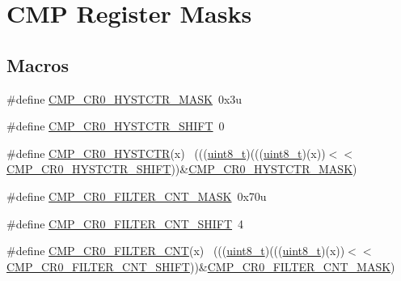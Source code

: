 \hypertarget{group___c_m_p___register___masks}{}\section{C\+MP Register Masks}
\label{group___c_m_p___register___masks}
\subsection*{Macros}
\begin{DoxyCompactItemize}
\item 
\#define \hyperlink{group___c_m_p___register___masks_ga9a81a95d8ceda15abb107f3c961e2f03}{C\+M\+P\+\_\+\+C\+R0\+\_\+\+H\+Y\+S\+T\+C\+T\+R\+\_\+\+M\+A\+SK}~0x3u
\item 
\#define \hyperlink{group___c_m_p___register___masks_ga12a965eae39b79d9e6066de9af418df3}{C\+M\+P\+\_\+\+C\+R0\+\_\+\+H\+Y\+S\+T\+C\+T\+R\+\_\+\+S\+H\+I\+FT}~0
\item 
\#define \hyperlink{group___c_m_p___register___masks_ga3ac2621a332671b38fa231e1fa14d26d}{C\+M\+P\+\_\+\+C\+R0\+\_\+\+H\+Y\+S\+T\+C\+TR}(x)                                          ~(((\hyperlink{_p_e___types_8h_aba7bc1797add20fe3efdf37ced1182c5}{uint8\+\_\+t})(((\hyperlink{_p_e___types_8h_aba7bc1797add20fe3efdf37ced1182c5}{uint8\+\_\+t})(x))$<$$<$\hyperlink{group___c_m_p___register___masks_ga12a965eae39b79d9e6066de9af418df3}{C\+M\+P\+\_\+\+C\+R0\+\_\+\+H\+Y\+S\+T\+C\+T\+R\+\_\+\+S\+H\+I\+FT}))\&\hyperlink{group___c_m_p___register___masks_ga9a81a95d8ceda15abb107f3c961e2f03}{C\+M\+P\+\_\+\+C\+R0\+\_\+\+H\+Y\+S\+T\+C\+T\+R\+\_\+\+M\+A\+SK})
\item 
\#define \hyperlink{group___c_m_p___register___masks_gab1e98c122818fe880217f72fab932ac2}{C\+M\+P\+\_\+\+C\+R0\+\_\+\+F\+I\+L\+T\+E\+R\+\_\+\+C\+N\+T\+\_\+\+M\+A\+SK}~0x70u
\item 
\#define \hyperlink{group___c_m_p___register___masks_ga07a4d57ab7d44b55b3d73f612aa7dd98}{C\+M\+P\+\_\+\+C\+R0\+\_\+\+F\+I\+L\+T\+E\+R\+\_\+\+C\+N\+T\+\_\+\+S\+H\+I\+FT}~4
\item 
\#define \hyperlink{group___c_m_p___register___masks_gad9cbe394311ddbb43945fcdade409c9e}{C\+M\+P\+\_\+\+C\+R0\+\_\+\+F\+I\+L\+T\+E\+R\+\_\+\+C\+NT}(x)                                    ~(((\hyperlink{_p_e___types_8h_aba7bc1797add20fe3efdf37ced1182c5}{uint8\+\_\+t})(((\hyperlink{_p_e___types_8h_aba7bc1797add20fe3efdf37ced1182c5}{uint8\+\_\+t})(x))$<$$<$\hyperlink{group___c_m_p___register___masks_ga07a4d57ab7d44b55b3d73f612aa7dd98}{C\+M\+P\+\_\+\+C\+R0\+\_\+\+F\+I\+L\+T\+E\+R\+\_\+\+C\+N\+T\+\_\+\+S\+H\+I\+FT}))\&\hyperlink{group___c_m_p___register___masks_gab1e98c122818fe880217f72fab932ac2}{C\+M\+P\+\_\+\+C\+R0\+\_\+\+F\+I\+L\+T\+E\+R\+\_\+\+C\+N\+T\+\_\+\+M\+A\+SK})

\end{DoxyCompactItemize}
